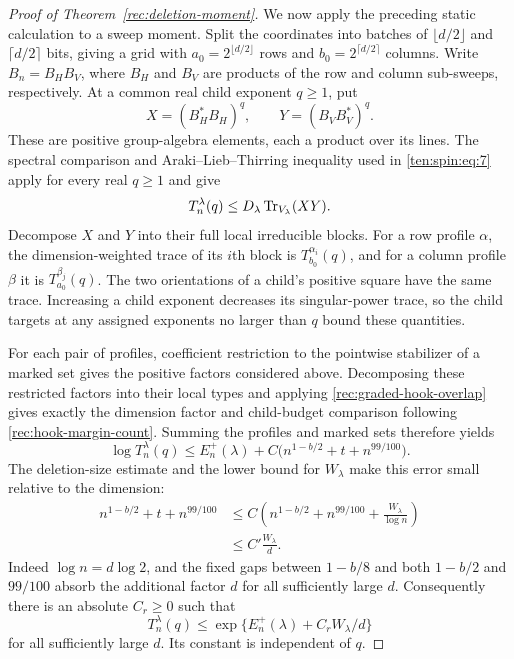 \begin{proof}[Proof of Theorem~\ref{rec:deletion-moment}]
We now apply the preceding static calculation to a sweep moment.
Split the coordinates into batches of $\lfloor d/2\rfloor$ and
$\lceil d/2\rceil$ bits, giving a grid with
$a_0=2^{\lfloor d/2\rfloor}$ rows and
$b_0=2^{\lceil d/2\rceil}$ columns. Write
$B_n=B_HB_V$, where $B_H$ and $B_V$ are products of the row and
column sub-sweeps, respectively. At a common real child exponent
$q\ge1$, put
\[
 X=(B_H^*B_H)^q,\qquad Y=(B_VB_V^*)^q.
\]
These are positive group-algebra elements, each a product over its
lines. The spectral comparison and Araki--Lieb--Thirring inequality
used in \eqref{ten:spin:eq:7} apply for every real $q\ge1$ and give
\[
 T_n^\lambda(q)\le D_\lambda\operatorname{Tr}_{V_\lambda}(XY).
\]
Decompose $X$ and $Y$ into their full local irreducible blocks.
For a row profile $\alpha$, the dimension-weighted trace of its
$i$th block is $T_{b_0}^{\alpha_i}(q)$, and for a column profile
$\beta$ it is $T_{a_0}^{\beta_j}(q)$. The two orientations of a
child's positive square have the same trace. Increasing a child
exponent decreases its singular-power trace, so the child targets
at any assigned exponents no larger than $q$ bound these quantities.

For each pair of profiles, coefficient restriction to the pointwise
stabilizer of a marked set gives the positive factors considered
above. Decomposing these restricted factors into their local types
and applying \eqref{rec:graded-hook-overlap} gives exactly the
dimension factor and child-budget comparison following
\eqref{rec:hook-margin-count}. Summing the profiles and marked sets
therefore yields
\[
 \log T_n^\lambda(q)
 \le E_n^+(\lambda)
       +C\bigl(n^{1-b/2}+t+n^{99/100}\bigr).
\]
The deletion-size estimate and the lower bound for $W_\lambda$
make this error small relative to the dimension:
\[
 \begin{split}
 n^{1-b/2}+t+n^{99/100}
 &\le C\left(n^{1-b/2}+n^{99/100}
                  +\frac{W_\lambda}{\log n}\right)\\
 &\le C'\frac{W_\lambda}{d}.
 \end{split}
\]
Indeed $\log n=d\log2$, and the fixed gaps between $1-b/8$ and
both $1-b/2$ and $99/100$ absorb the additional factor $d$ for all
sufficiently large $d$. Consequently there is an absolute
$C_r\ge0$ such that
\begin{equation}\label{rec:deletion-preliminary-moment}
 T_n^\lambda(q)\le
 \exp\{E_n^+(\lambda)+C_rW_\lambda/d\}
\end{equation}
for all sufficiently large $d$. Its constant is independent of $q$.


\end{proof}

